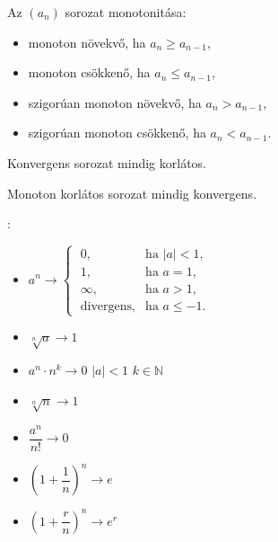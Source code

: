 \documentclass[a4paper, 12pt]{scrartcl}
\begin{document}
\begin{definition}
  Az $(a_n)$ sorozat monotonitása:
  \begin{itemize}
    \item monoton növekvő, ha $a_n \geq a_{n-1}$,
    \item monoton csökkenő, ha $a_n \leq a_{n-1}$,
    \item szigorúan monoton növekvő, ha $a_n > a_{n-1}$,
    \item szigorúan monoton csökkenő, ha $a_n < a_{n-1}$.
  \end{itemize}
\end{definition}

\begin{note}
  Konvergens sorozat mindig korlátos.

  Monoton korlátos sorozat mindig konvergens.
\end{note}

\begin{blueBox}
  :

  \begin{itemize}
    \item $
            a^n \rightarrow \begin{cases}
              \;0,                & \text{ha } |a| < 1,   \\
              \;1,                & \text{ha } a = 1,     \\
              \;\infty,           & \text{ha } a > 1,     \\
              \;\text{divergens}, & \text{ha } a \leq -1.
            \end{cases}
          $

    \item $
            \sqrt[n]{a} \rightarrow 1
          $

    \item $
            a^n \cdot n^k \rightarrow 0
          $
          $
            |a|<1
          $
          $
            k \in \mathbb N
          $

    \item  $
            \sqrt[n]{n} \rightarrow 1
          $

    \item $
            \dfrac{a^n}{n!} \rightarrow 0
          $

    \item $
            \left(1 + \dfrac{1}{n}\right)^n \rightarrow e
          $

    \item $
            \left(1 + \dfrac{r}{n}\right)^n \rightarrow e^r
          $
  \end{itemize}
\end{blueBox}
\end{document}
